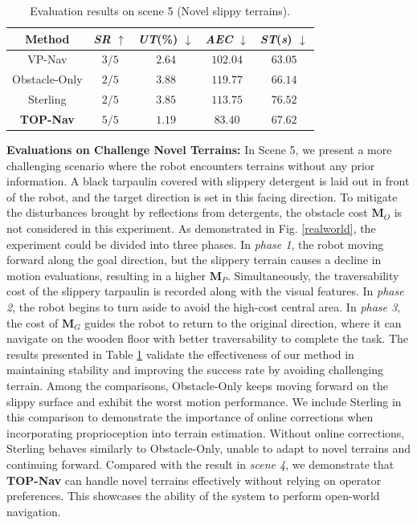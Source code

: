 \documentclass[conference]{IEEEtran}
\begin{document}
\begin{table}[t]
\small
\renewcommand{\arraystretch}{1.3}
\caption{{Evaluation results on scene 5 (Novel slippy terrains).}}
\begin{center}
\begin{tabular}{c|c c c c} 
\hline
\textbf{Method}&{\textit{SR}} $\uparrow$ &{\textit{UT}(\%)} $\downarrow$ &{\textit{AEC}} $\downarrow$ & {\textit{ST}(\textit{s})} $\downarrow$\\
\hline
VP-Nav            & ${3/5}$& ${2.64}$     & ${102.04}$    & $\bm{63.05}$\\
Obstacle-Only     & ${2/5}$& ${3.88}$     & ${119.77}$    & ${66.14}$\\
Sterling          & ${2/5}$& ${3.85}$     & ${113.75}$    & ${76.52}$\\
\textbf{TOP-Nav}  & ${5/5}$& ${\bm{1.19}}$& ${\bm{83.40}}$& ${67.62} $\\
\hline
\end{tabular}
\label{Real World5}
\end{center}
\end{table}

\noindent\textbf{{Evaluations on Challenge Novel Terrains:}} 
{ In Scene 5, we present a more challenging scenario where the robot encounters terrains without any prior information. A black tarpaulin covered with slippery detergent is laid out in front of the robot, and the target direction is set in this facing direction. To mitigate the disturbances brought by reflections from detergents, the obstacle cost ${\bm{M}_{O}}$ is not considered in this experiment. As demonstrated in Fig. \ref{realworld}, the experiment could be divided into three phases. In \textit{phase 1}, the robot moving forward along the goal direction, but the slippery terrain causes a decline in motion evaluations, resulting in a higher ${\bm{M}_{P}}$. Simultaneously, the traversability cost of the slippery tarpaulin is recorded along with the visual features. In \textit{phase 2}, the robot begins to turn aside to avoid the high-cost central area. In \textit{phase 3}, the cost of ${\bm{M}_{G}}$ guides the robot to return to the original direction, where it can navigate on the wooden floor with better traversability to complete the task. The results presented in Table \ref{Real World5} validate the effectiveness of our method in maintaining stability and improving the success rate by avoiding challenging terrain. Among the comparisons, Obstacle-Only keeps moving forward on the slippy surface and exhibit the worst motion performance. We include Sterling in this comparison to demonstrate the importance of online corrections when incorporating proprioception into terrain estimation. Without online corrections, Sterling behaves similarly to Obstacle-Only, unable to adapt to novel terrains and continuing forward. Compared with the result in \textit{scene 4}, we demonstrate that \textbf{TOP-Nav} can handle novel terrains effectively without relying on operator preferences. This showcases the ability of the system to perform open-world navigation.}
\end{document}
